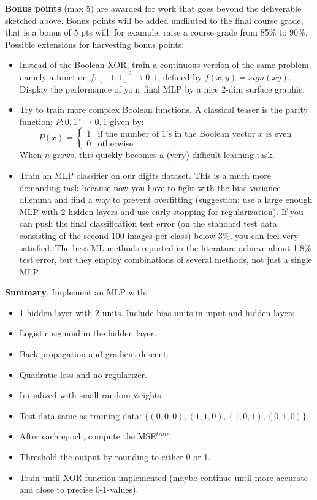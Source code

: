 \documentclass[12pt]{article}
\begin{document}
\noindent
\textbf{Bonus points} (max 5) are awarded for work that goes beyond the deliverable sketched above. Bonus points will be added undiluted to the final course grade, that is a bonus of 5 pts will, for example, raise a course grade from 85\% to 90\%.\\
Possible extensions for harvesting bonus points:
\begin{itemize}
	\item Instead of the Boolean XOR, train a continuous version of the same problem, namely a function $f: [-1, 1]^2 \rightarrow {0,1}$, defined by $f(x, y) = sign(xy)$. Display the performance of your final MLP by a nice 2-dim surface graphic.
	\item Try to train more complex Boolean functions. A classical teaser is the parity function: $P: {0,1}^n \rightarrow {0,1}$ given by:
		\begin{equation}
			P(x) = \begin{cases}
				1 & \text{if the number of 1's in the Boolean vector $x$ is even}\\
				0 & \text{otherwise}
			\end{cases}
		\end{equation}
		When $n$ grows, this quickly becomes a (very) difficult learning task.
	\item Train an MLP classifier on our digits dataset. This is a much more demanding task because now you have to fight with the bias-variance dilemma and find a way to prevent overfitting (suggestion: use a large enough MLP with 2 hidden layers and use early stopping for regularization). If you can push the final classification test error (on the standard test data consisting of the second 100 images per class) below 3\%, you can feel very satisfied. The best ML methods reported in the literature achieve about 1.8\% test error, but they employ combinations of several methods, not just a single MLP.
\end{itemize}

\clearpage
\textbf{Summary}. Implement an MLP with:
\begin{itemize}
	\item 1 hidden layer with 2 units. Include bias units in input and hidden layers.
	\item Logistic sigmoid in the hidden layer.
	\item Back-propagation and gradient descent.
	\item Quadratic loss and no regularizer.
	\item Initialized with small random weights.
	\item Test data same as training data: $\{(0,0,0), (1,1,0), (1,0,1), (0,1,0)\}$.
	\item After each epoch, compute the MSE$^{train}$.
	\item Threshold the output by rounding to either 0 or 1.
	\item Train until XOR function implemented (maybe continue until more accurate and close to precise 0-1-values).
\end{itemize}
\end{document}
